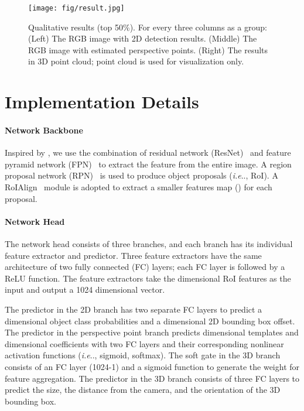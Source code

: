 \documentclass{article}
\makeatletter
\DeclareRobustCommand\onedot{\futurelet\@let@token\@onedot}
\def\@onedot{\ifx\@let@token.\else.\null\fi\xspace}
\def\ie{\emph{i.e}\onedot} \def\Ie{\emph{I.e}\onedot}
\makeatother
\begin{document}
\begin{figure}[t!]
    \begin{center}
        \texttt{[image: fig/result.jpg]}
    \end{center}
    \vspace{-6pt}
    \caption{Qualitative results (top 50\%). For every three columns as a group: (Left) The RGB image with 2D detection results. (Middle) The RGB image with estimated perspective points. (Right) The results in 3D point cloud; point cloud is used for visualization only.}
    \label{fig:result}
    \vspace{6pt}
\end{figure}

\section{Implementation Details}
\label{sec:details}

\paragraph{Network Backbone} Inspired by \citet{he2017mask}, we use the combination of residual network (ResNet)~\cite{he2016deep} and feature pyramid network (FPN)~\cite{lin2017feature} to extract the feature from the entire image. A region proposal network (RPN)~\cite{ren2015faster} is used to produce object proposals (\ie, RoI). A RoIAlign~\cite{he2017mask} module is adopted to extract a smaller features map () for each proposal.

\paragraph{Network Head} The network head consists of three branches, and each branch has its individual feature extractor and predictor. Three feature extractors have the same architecture of two fully connected (FC) layers; each FC layer is followed by a ReLU function. The feature extractors take the  dimensional RoI features as the input and output a 1024 dimensional vector.

The predictor in the 2D branch has two separate FC layers to predict a  dimensional object class probabilities and a  dimensional 2D bounding box offset. The predictor in the perspective point branch predicts  dimensional templates and  dimensional coefficients with two FC layers and their corresponding nonlinear activation functions (\ie, sigmoid, softmax). The soft gate in the 3D branch consists of an FC layer (1024-1) and a sigmoid function to generate the weight for feature aggregation. The predictor in the 3D branch consists of three FC layers to predict the size, the distance from the camera, and the orientation of the 3D bounding box.
\end{document}
